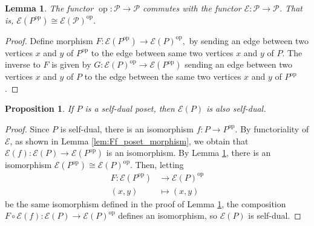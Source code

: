\documentclass[smallextended, envcountsame, numbook]{svjour3}
\theoremstyle{plain}
\newtheorem{prop}[thm]{Proposition}
\newtheorem{lem}[thm]{Lemma}
\theoremstyle{definition}
\theoremstyle{remark}
\numberwithin{equation}{section}
\newcommand\op{\operatorname{op}}
\begin{document}
\begin{lem}
\label{lem:commuting_op_e}
The functor $\op\colon\mathcal P \rightarrow \mathcal P$ commutes with the functor $\mathcal E\colon\mathcal P \rightarrow \mathcal P$. That is, $\mathcal E(P^{\op}) \cong \mathcal E(\mathcal P)^{\op}$.
\end{lem}
\begin{proof}
Define morphism  $F\colon\mathcal E(P^{\op}) \rightarrow \mathcal E(P)^{\op},$ by sending an edge between two vertices $x$ and $y$ of $P^{\op}$ to the edge between same two vertices $x$ and $y$ of $P$. The inverse to $F$ is given by $G\colon\mathcal E(P)^{\op} \rightarrow \mathcal E(P^{\op})$ sending an edge between two vertices $x$ and $y$ of $P$ to the edge between the same two vertices $x$ and $y$ of $P^{\op}$. 
\end{proof}



\begin{prop}
\label{prop:self_dual_preservation}
If $P$ is a self-dual poset, then $\mathcal E(P)$ is also self-dual.
\end{prop}
\begin{proof}
Since $P$ is self-dual, there is an isomorphism $f\colon P \rightarrow P^{\op}$. By functoriality of $\mathcal E$, as shown in Lemma \ref{lem:Ff_poset_morphism}, we obtain that $\mathcal E(f)\colon\mathcal E(P) \rightarrow \mathcal E(P^{\op})$ is an isomorphism. By Lemma \ref{lem:commuting_op_e}, there is an isomorphism $\mathcal E(P^{\op}) \cong \mathcal E(P)^{\op}$. Then, letting 
\begin{align*}
F\colon\mathcal E(P^{\op}) &\rightarrow \mathcal E(P)^{\op}\\
(x,y) &\mapsto (x,y)
\end{align*}
be the same isomorphism defined in the proof of Lemma \ref{lem:commuting_op_e}, the composition $F\circ \mathcal E(f)\colon\mathcal E(P) \rightarrow \mathcal E(P)^{\op}$ defines an isomorphism, so $\mathcal E(P)$ is self-dual.
\end{proof}
\end{document}
